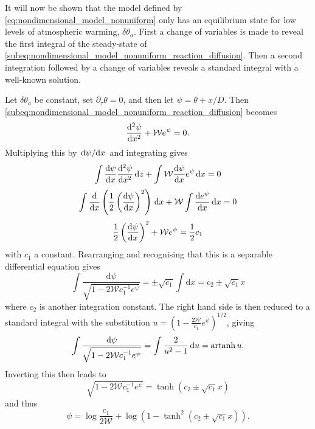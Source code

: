 It will now be shown that the model defined by \cref{eq:nondimensional_model_nonuniform} only has an equilibrium state for low levels of atmospheric warming, $\delta\theta_a$.
First a change of variables is made to reveal the first integral of the steady-state of 
\cref{subeq:nondimensional_model_nonuniform_reaction_diffusion}. Then a second integration followed by a change of variables reveals a standard integral with a
well-known solution.

Let $\delta\theta_a$ be constant, set $\partial_{\tau}\theta = 0$, and then let $\psi = \theta + x/D$. Then \cref{subeq:nondimensional_model_nonuniform_reaction_diffusion} becomes
\begin{equation}
  \dv[2]{\psi}{x} + \mathcal{W}e^{\psi} = 0.
\end{equation}
Multiplying this by $\dv*{\psi}{x}$ and integrating gives
\begin{equation}
  \int\dv{\psi}{x}\dv[2]{\psi}{x}\,\mathrm{d}z + \int\mathcal{W}\dv{\psi}{x}e^\psi\,\mathrm{d}{x} = 0
\end{equation}
\begin{equation}
  \int \dv{x}\left(\frac{1}{2}\left(\dv{\psi}{x}\right)^2\right)\,\mathrm{d}x + \mathcal{W} \int \dv{e^{\psi}}{x} \, \mathrm{d}x = 0
\end{equation}
\begin{equation}
  \frac{1}{2} \left(\dv{\psi}{x}\right)^2 + \mathcal{W}e^{\psi} = \frac{1}{2} c_1
\end{equation}
with $c_1$ a constant.
Rearranging and recognising that this is a separable differential equation gives
\begin{equation}
  \int \frac{\mathrm{d}\psi}{\sqrt{1 - 2\mathcal{W}c_1^{-1} e^{\psi}}} = \pm\sqrt{c_1} \int \mathrm{d}x = c_2 \pm \sqrt{c_1} x 
\end{equation}
where $c_2$ is another integration constant. The right hand side is then reduced to a standard integral \parencite{riley2006}
with the substitution $u = \left(1 - \frac{2\mathcal{W}}{c_1} e^{\psi}\right)^{1/2}$, giving
\begin{equation}
  \int \frac{\mathrm{d}\psi}{\sqrt{1 - 2\mathcal{W}c_1^{-1} e^{\psi}}} = \int \frac{2}{u^2 - 1} \,\mathrm{d}u = \operatorname{artanh} u. 
\end{equation}
Inverting this then leads to
\begin{equation}
  \sqrt{1 - 2\mathcal{W}c_1^{-1} e^{\psi}} = \tanh\left(c_2 \pm \sqrt{c_1} x\right)
\end{equation}
and thus
\begin{equation}
  \psi = \log \frac{c_1}{2\mathcal{W}} + \log \left(1 - \tanh^2 \left(c_2 \pm \sqrt{c_1} x\right)\right).
\end{equation}
